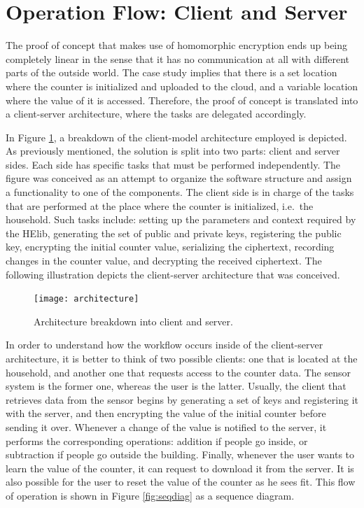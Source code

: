 \section{{Operation Flow: Client and Server}}

The proof of concept that makes use of homomorphic encryption ends up being completely linear in the sense that it has no communication at all with different parts of the outside world. The case study implies that there is a set location where the counter is initialized and uploaded to the cloud, and a variable location where the value of it is accessed. Therefore, the proof of concept is translated into a client-server architecture, where the tasks are delegated accordingly. 

In Figure \ref{fig:clientserver}, a breakdown of the client-model architecture employed is depicted. As previously mentioned, the solution is split into two parts: client and server sides. Each side has specific tasks that must be performed independently. The figure was conceived as an attempt to organize the software structure and assign a functionality to one of the components. The client side is in charge of the tasks that are performed at the place where the counter is initialized, i.e.\ the household. Such tasks include: setting up the parameters and context required by the HElib, generating the set of public and private keys, registering the public key, encrypting the initial counter value, serializing the ciphertext, recording changes in the counter value, and decrypting the received ciphertext. The following illustration depicts the client-server architecture that was conceived. 

\begin{figure}[H]
  \centering
  \texttt{[image: architecture]}
 \caption{Architecture breakdown into client and server.}
 \label{fig:clientserver}
\end{figure}

In order to understand how the workflow occurs inside of the client-server architecture, it is better to think of two possible clients: one that is located at the household, and another one that requests access to the counter data. The sensor system is the former one, whereas the user is the latter. Usually, the client that retrieves data from the sensor begins by generating a set of keys and registering it with the server, and then encrypting the value of the initial counter before sending it over. Whenever a change of the value is notified to the server, it performs the corresponding operations: addition if people go inside, or subtraction if people go outside the building. Finally, whenever the user wants to learn the value of the counter, it can request to download it from the server. It is also possible for the user to reset the value of the counter as he sees fit. This flow of operation is shown in Figure \ref{fig:seqdiag} as a sequence diagram.

